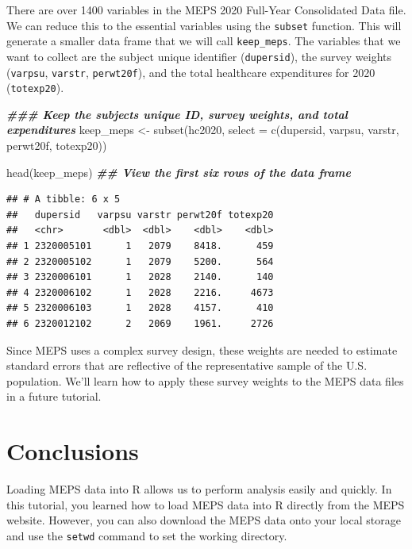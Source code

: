 \documentclass[
]{book}
\newenvironment{Shaded}{\begin{snugshade}}{\end{snugshade}}
\newcommand{\AttributeTok}[1]{\textcolor[rgb]{0.77,0.63,0.00}{#1}}
\newcommand{\DocumentationTok}[1]{\textcolor[rgb]{0.56,0.35,0.01}{\textbf{\textit{#1}}}}
\newcommand{\FunctionTok}[1]{\textcolor[rgb]{0.00,0.00,0.00}{#1}}
\newcommand{\NormalTok}[1]{#1}
\newcommand{\OtherTok}[1]{\textcolor[rgb]{0.56,0.35,0.01}{#1}}
\theoremstyle{definition}
\theoremstyle{definition}
\theoremstyle{definition}
\theoremstyle{definition}
\theoremstyle{remark}
\begin{document}
There are over 1400 variables in the MEPS 2020 Full-Year Consolidated Data file. We can reduce this to the essential variables using the \texttt{subset} function. This will generate a smaller data frame that we will call \texttt{keep\_meps}. The variables that we want to collect are the subject unique identifier (\texttt{dupersid}), the survey weights (\texttt{varpsu}, \texttt{varstr}, \texttt{perwt20f}), and the total healthcare expenditures for 2020 (\texttt{totexp20}).

\begin{Shaded}
\begin{Highlighting}[]
\DocumentationTok{\#\#\# Keep the subject\textquotesingle{}s unique ID, survey weights, and total expenditures}
\NormalTok{keep\_meps }\OtherTok{\textless{}{-}} \FunctionTok{subset}\NormalTok{(hc2020, }\AttributeTok{select =} \FunctionTok{c}\NormalTok{(dupersid, varpsu, varstr, perwt20f, totexp20))}

\FunctionTok{head}\NormalTok{(keep\_meps) }\DocumentationTok{\#\# View the first six rows of the data frame}
\end{Highlighting}
\end{Shaded}

\begin{verbatim}
## # A tibble: 6 x 5
##   dupersid   varpsu varstr perwt20f totexp20
##   <chr>       <dbl>  <dbl>    <dbl>    <dbl>
## 1 2320005101      1   2079    8418.      459
## 2 2320005102      1   2079    5200.      564
## 3 2320006101      1   2028    2140.      140
## 4 2320006102      1   2028    2216.     4673
## 5 2320006103      1   2028    4157.      410
## 6 2320012102      2   2069    1961.     2726
\end{verbatim}

Since MEPS uses a complex survey design, these weights are needed to estimate standard errors that are reflective of the representative sample of the U.S. population. We'll learn how to apply these survey weights to the MEPS data files in a future tutorial.

\hypertarget{conclusions}{%
\section{Conclusions}\label{conclusions}}

Loading MEPS data into R allows us to perform analysis easily and quickly. In this tutorial, you learned how to load MEPS data into R directly from the MEPS website. However, you can also download the MEPS data onto your local storage and use the \texttt{setwd} command to set the working directory.
\end{document}
